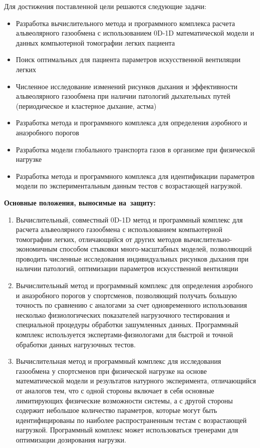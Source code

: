 Для достижения поставленной цели решаются следующие задачи:

\begin{itemize}
\item
Разработка вычислительного метода и программного комплекса расчета альвеолярного газообмена с использованием 0D-1D математической модели и данных компьютерной томографии легких пациента  
\item
Поиск оптимальных для пациента параметров искусственной вентиляции легких
\item
Численное исследование изменений рисунков дыхания и эффективности альвеолярного газообмена при наличии патологий дыхательных путей (периодическое и кластерное дыхание, астма)
\item
Разработка метода и программного комплекса для определения аэробного и анаэробного порогов
\item
Разработка модели глобального транспорта газов в организме при физической нагрузке
\item
Разработка метода и программного комплекса для идентификации параметров модели по экспериментальным данным тестов с возрастающей нагрузкой.
\end{itemize}

\textbf{Основные положения, выносимые на~защиту:}
\begin{enumerate}
 \item
 Вычислительный, совместный 0D-1D метод и программный комплекс для расчета альвеолярного газообмена с использованием компьютерной томографии легких, отличающийся от других методов вычислительно-экономичным способом стыковки много-масштабных моделей, позволяющий проводить численные исследования индивидуальных рисунков дыхания при наличии патологий, оптимизации параметров искусственной вентиляции 
 \item
 Вычислительный метод и программный комплекс для определения аэробного и анаэробного порогов у спортсменов, позволяющий получать большую точность по сравнению с аналогами за счет одновременного использования несколько физиологических показателей нагрузочного тестирования и специальной процедуры обработки зашумленных данных. Программный комплекс используется экспертами-физиологами для быстрой и точной обработки данных нагрузочных тестов.
 \item
 Вычислительная метод и программный комплекс для исследования газообмена у спортсменов при физической нагрузке на основе математической модели и результатов натурного эксперимента, отличающийся от аналогов тем, что с одной стороны включает в себя основные лимитирующих физические возможности системы, а с другой стороны содержит небольшое количество параметров, которые могут быть идентифицированы по наиболее распространенным тестам с возрастающей нагрузкой. Программный комплекс может использоваться тренерами для оптимизации дозирования нагрузки.   
   
\end{enumerate}

